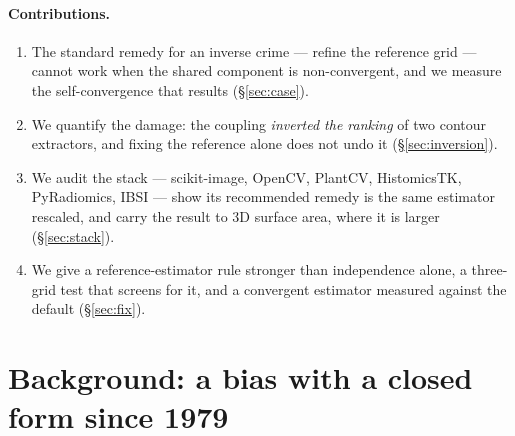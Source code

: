 \documentclass{article}
\begin{document}
\paragraph{Contributions.}
\begin{enumerate}\itemsep1pt
  \item The standard remedy for an inverse crime --- refine the reference grid --- cannot work
        when the shared component is non-convergent, and we measure the self-convergence that
        results (\S\ref{sec:case}).
  \item We quantify the damage: the coupling \emph{inverted the ranking} of two contour
        extractors, and fixing the reference alone does not undo it (\S\ref{sec:inversion}).
  \item We audit the stack --- scikit-image, OpenCV, PlantCV, HistomicsTK, PyRadiomics, IBSI ---
        show its recommended remedy is the same estimator rescaled, and carry the result to 3D
        surface area, where it is larger (\S\ref{sec:stack}).
  \item We give a reference-estimator rule stronger than independence alone, a three-grid test
        that screens for it, and a convergent estimator measured against the default
        (\S\ref{sec:fix}).
\end{enumerate}

\section{Background: a bias with a closed form since 1979}
\label{sec:background}
\end{document}
